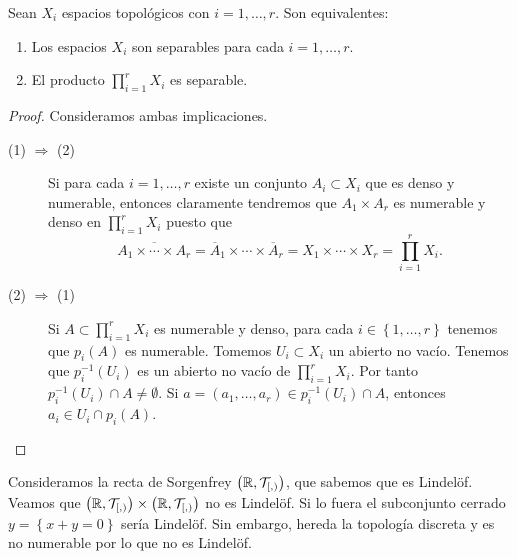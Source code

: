 \begin{prop}
Sean $\displaystyle X_{i} $ espacios topológicos con $\displaystyle i = 1, \ldots, r $. Son equivalentes:
\begin{enumerate}
\item Los espacios $\displaystyle X_{i} $ son separables para cada $\displaystyle i = 1, \ldots, r $. 
\item El producto $\displaystyle \prod^{r}_{i = 1}X_{i} $ es separable. 
\end{enumerate}
\end{prop}
\begin{proof}
Consideramos ambas implicaciones.
\begin{description}
\item[(1) $\displaystyle \Rightarrow $ (2)] Si para cada $\displaystyle i = 1, \ldots, r $ existe un conjunto $\displaystyle A_{i}\subset X_{i} $ que es denso y numerable, entonces claramente tendremos que $\displaystyle A_{1} \times A_{r} $ es numerable y denso en $\displaystyle \prod^{r}_{i = 1}X_{i} $ puesto que 
	\[ \overline{A_{1} \times \cdots \times A_{r}}= \overline{A}_{1} \times \cdots \times \overline{A}_{r} = X_{1} \times \cdots \times X_{r} = \prod^{r}_{i = 1}X_{i} .\]
\item[(2) $\displaystyle \Rightarrow $ (1)] Si $\displaystyle A \subset \prod^{r}_{i= 1}X_{i} $ es numerable y denso, para cada $\displaystyle i \in \left\{ 1, \ldots, r\right\}  $ tenemos que $\displaystyle p_{i}\left(A\right) $ es numerable. Tomemos $\displaystyle U_{i}\subset X_{i} $ un abierto no vacío. Tenemos que $\displaystyle p^{-1}_{i}\left(U_{i}\right) $ es un abierto no vacío de $\displaystyle \prod^{r}_{i = 1}X_{i} $. Por tanto $\displaystyle p^{-1}_{i}\left(U_{i}\right)\cap A \neq \emptyset $. Si $\displaystyle a = \left(a_{1}, \ldots, a_{r}\right)\in p^{-1}_{i}\left(U_{i}\right)\cap A $, entonces $\displaystyle a_{i} \in U_{i} \cap p_{i}\left(A\right) $. 
\end{description}
\end{proof}
\begin{eg}
	Consideramos la recta de Sorgenfrey $\displaystyle \left(\mathbb{R}, \mathcal{T}_{[,)}\right) $, que sabemos que es Lindelöf. Veamos que $\displaystyle \left(\mathbb{R}, \mathcal{T}_{[,)}\right) \times \left(\mathbb{R}, \mathcal{T}_{[,)}\right) $ no es Lindelöf. Si lo fuera el subconjunto cerrado $\displaystyle y = \left\{ x + y = 0\right\}  $ sería Lindelöf. Sin embargo, hereda la topología discreta y es no numerable por lo que no es Lindelöf.
\end{eg}
